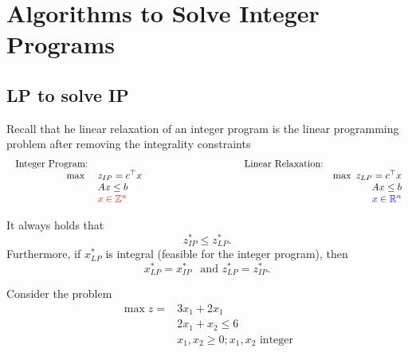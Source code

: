 \documentclass[../open-optimization/open-optimization.tex]{subfiles}
\begin{document}
\chapter{Algorithms to Solve Integer Programs}
\label{sec:IP-algorithms}
\section{LP to solve IP}

Recall that he linear relaxation of an integer program is the linear programming problem after removing the integrality constraints
$$
\begin{array}{rlclr}
\text{ Integer Program:} & & & \text{Linear Relaxation:}\\
\max \ & z_{IP} = c^\top x & \hspace{3cm} & & \max \  z_{LP} = c^\top x \\
& Ax \leq b & & & Ax \leq b\\
& \tred{x \in \Z^n} & & & \tblue{x \in \R^n}
\end{array}
$$

\begin{theorem}[LP Bounds]
It always holds that 
\begin{equation}
z^*_{IP} \leq z^*_{LP}.
\end{equation}
Furthermore, if $x^*_{LP}$ is integral (feasible for the integer program), then 
\begin{equation}
x^*_{LP} = x^*_{IP} \ \ \text{ and } z^*_{LP} = z^*_{IP}.
\end{equation}
\end{theorem}

\begin{example}

%
\begin{minipage}[t]{0.5\textwidth}
Consider the problem 
\begin{align*}
\max z = & 3x_1 + 2x_1\\
& 2x_1 + x_2 \leq 6\\
& x_1, x_2 \geq 0; x_1, x_2 \text{ integer}
\end{align*}
\end{minipage}
%
\begin{minipage}[t]{0.4\textwidth}
\end{minipage}
\end{example}
\end{document}
